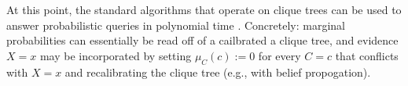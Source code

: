 \documentclass[twoside]{article}
\begin{document}
At this point, the standard algorithms that operate on
clique trees
can be used to answer probabilistic queries in polynomial time \parencite[\S 10.3.3]{koller2009probabilistic}.
Concretely: marginal probabilities can essentially be read off of a cailbrated a clique tree,
and evidence $X{=}x$ may be incorporated by
setting $\mu_C(c) := 0$ for every $C{=}c$ that conflicts with $X{=}x$
and recalibrating the clique tree (e.g., with belief propogation).
%
\end{document}
